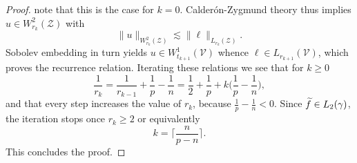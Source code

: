 \begin{proof}
note that this is the case for $k=0$.
Calder\'on-Zygmund theory  thus implies $u \in W^2_{r_k}(\mathcal{Z})$ with
%
\[
\|u\|_{W^2_{r_k}(\mathcal{Z})} \lesssim \|\ell\|_{L_{r_k}(\mathcal{Z})}.
\]
%
Sobolev embedding in turn yields $u \in W^1_{t_{k+1}}(\mathcal{V})$ whence
$\ell \in L_{r_{k+1}}(\mathcal{V})$, which proves the recurrence relation.
Iterating these relations we see that for $k\ge0$
%
\[
\frac{1}{r_k} = \frac{1}{r_{k-1}} + \frac{1}{p} - \frac{1}{n}
= \frac{1}{2} + \frac{1}{p} + k \Big( \frac{1}{p} - \frac{1}{n} \Big),
\]
%
and that every step increases the value of $r_k$, because $\frac{1}{p}-\frac{1}{n}<0$.
Since $\widetilde{f}\in L_2(\gamma)$, the iteration stops once $r_k\ge2$ or equivalently
%
\[
k = \Big\lceil \frac{n}{p-n} \Big\rceil.
\]
%
This concludes the proof.
\end{proof}
  
